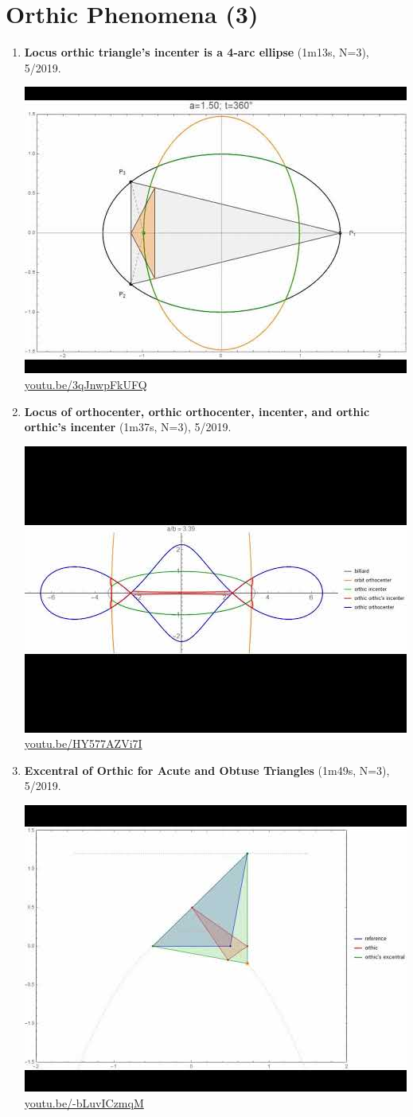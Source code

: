 \documentclass[12pt]{amsart}
\begin{document}
\section{Orthic Phenomena (3)}

\begin{enumerate}[resume]
\item \textbf{Locus orthic triangle's incenter is a 4-arc ellipse} (1m13s, N=3), 5/2019. 
\begin{center}\includegraphics[width=.5\textwidth]{pics/3qJnwpFkUFQ.jpg} \\ 
\href{https://youtu.be/3qJnwpFkUFQ}{\url{youtu.be/3qJnwpFkUFQ}}\end{center}
% 
\item \textbf{Locus of orthocenter, orthic orthocenter, incenter, and orthic orthic's incenter} (1m37s, N=3), 5/2019. 
\begin{center}\includegraphics[width=.5\textwidth]{pics/HY577AZVi7I.jpg} \\ 
\href{https://youtu.be/HY577AZVi7I}{\url{youtu.be/HY577AZVi7I}}\end{center}
% 
\item \textbf{Excentral of Orthic for Acute and Obtuse Triangles} (1m49s, N=3), 5/2019. 
\begin{center}\includegraphics[width=.5\textwidth]{pics/-bLuvICzmqM.jpg} \\ 
\href{https://youtu.be/-bLuvICzmqM}{\url{youtu.be/-bLuvICzmqM}}\end{center}
% 
\end{enumerate}
\end{document}
